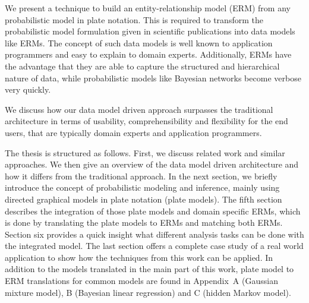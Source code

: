 We present a technique to build an entity-relationship model (ERM) from any probabilistic model in plate notation. This is required to transform the probabilistic model formulation given in scientific publications into data models like ERMs. The concept of such data models is well known to application programmers and easy to explain to domain experts. Additionally, ERMs have the advantage that they are able to capture the structured and hierarchical nature of data, while probabilistic models like Bayesian networks become verbose very quickly.

We discuss how our data model driven approach surpasses the traditional architecture in terms of usability, comprehensibility and flexibility for the end users, that are typically domain experts and application programmers.

The thesis is structured as follows. First, we discuss related work and similar approaches. We then give an overview of the data model driven architecture and how it differs from the traditional approach. In the next section, we briefly introduce the concept of probabilistic modeling and inference, mainly using directed graphical models in plate notation (plate models). The fifth section describes the integration of those plate models and domain specific ERMs, which is done by translating the plate models to ERMs and matching both ERMs. Section six provides a quick insight what different analysis tasks can be done with the integrated model. The last section offers a complete case study of a real world application to show how the techniques from this work can be applied. In addition to the models translated in the main part of this work, plate model to ERM translations for common models are found in Appendix~A (Gaussian mixture model), B (Bayesian linear regression) and C (hidden Markov model).
